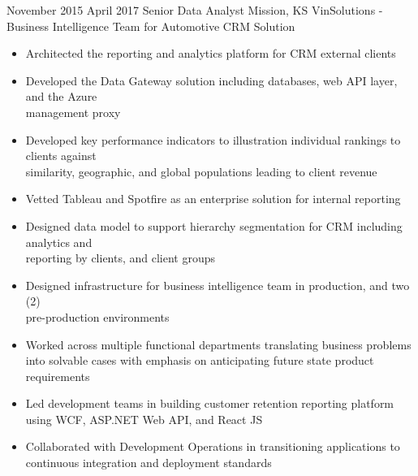 \vspace*{0.05 in}

\ProjectExperience
{November 2015}
{April 2017}
{Senior Data Analyst}
{Mission, KS}
{VinSolutions - Business Intelligence Team for Automotive CRM Solution}
{\begin{itemize}
     \item Architected the reporting and analytics platform for CRM external clients
     \item Developed the Data Gateway solution including databases, web API layer, and the
     Azure \\management proxy
     \item Developed key performance indicators to illustration individual rankings to clients
     against \\similarity, geographic, and global populations leading to client revenue
\end{itemize}}
{\begin{itemize}
    \item Vetted Tableau and Spotfire as an enterprise solution for internal reporting
    \item Designed data model to support hierarchy segmentation for CRM including analytics and
    \\reporting by clients, and client groups
    \item Designed infrastructure for business intelligence team in production, and two (2)
    \\pre-production environments
\end{itemize}}
{\begin{itemize}
    \item Worked across multiple functional departments translating business problems into
    solvable cases with emphasis on anticipating future state product requirements
    \item Led development teams in building customer retention reporting platform using WCF,
    ASP.NET Web API, and React JS
    \item Collaborated with Development Operations in transitioning applications to continuous
    integration and deployment standards
\end{itemize}}

\vspace*{0.05 in}

